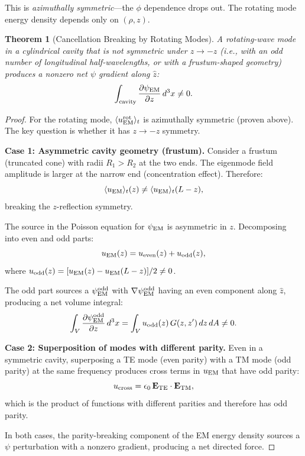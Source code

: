 \documentclass[aps,prd,twocolumn,superscriptaddress,floatfix,nofootinbib]{revtex4-2}
\newtheorem{theorem}{Theorem}
\begin{document}
This is \emph{azimuthally symmetric}---the $\phi$ dependence drops
out. The rotating mode energy density depends only on $(\rho, z)$.

\begin{theorem}[Cancellation Breaking by Rotating Modes]
\label{thm:breaking}
A rotating-wave mode in a cylindrical cavity that is \emph{not}
symmetric under $z \to -z$ (i.e., with an odd number of longitudinal
half-wavelengths, or with a frustum-shaped geometry) produces a
nonzero net $\psi$ gradient along $\hat{z}$:
\begin{equation}
\int_{\rm cavity}\frac{\partial\psi_{\rm EM}}{\partial z}\,d^3x
\neq 0.
\label{eq:breaking-result}
\end{equation}
\end{theorem}

\begin{proof}
For the rotating mode, $\langle u_{\rm EM}^{\rm rot}\rangle_t$
is azimuthally symmetric (proven above). The key question is
whether it has $z \to -z$ symmetry.

\textbf{Case 1: Asymmetric cavity geometry (frustum).}
Consider a frustum (truncated cone) with radii $R_1 > R_2$ at
the two ends. The eigenmode field amplitude is larger at the
narrow end (concentration effect). Therefore:
\begin{equation}
\langle u_{\rm EM}\rangle_t(z)
\neq \langle u_{\rm EM}\rangle_t(L - z),
\end{equation}
breaking the $z$-reflection symmetry.

The source in the Poisson equation for $\psi_{\rm EM}$ is
asymmetric in $z$. Decomposing into even and odd parts:
\begin{equation}
u_{\rm EM}(z) = u_{\rm even}(z) + u_{\rm odd}(z),
\end{equation}
where $u_{\rm odd}(z) = [u_{\rm EM}(z) - u_{\rm EM}(L-z)]/2 \neq 0$.

The odd part sources a $\psi_{\rm EM}^{\rm odd}$ with
$\nabla\psi_{\rm EM}^{\rm odd}$ having an even component along
$\hat{z}$, producing a net volume integral:
\begin{equation}
\int_V\frac{\partial\psi_{\rm EM}^{\rm odd}}{\partial z}\,d^3x
= \int_V u_{\rm odd}(z)\,G(z,z')\,dz\,dA \neq 0.
\end{equation}

\textbf{Case 2: Superposition of modes with different parity.}
Even in a symmetric cavity, superposing a TE mode (even parity)
with a TM mode (odd parity) at the same frequency produces cross
terms in $u_{\rm EM}$ that have odd parity:
\begin{equation}
u_{\rm cross} = \epsilon_0\,\mathbf{E}_{\rm TE}\cdot
\mathbf{E}_{\rm TM},
\end{equation}
which is the product of functions with different parities and
therefore has odd parity.

In both cases, the parity-breaking component of the EM energy
density sources a $\psi$ perturbation with a nonzero gradient,
producing a net directed force.
\end{proof}
\end{document}

